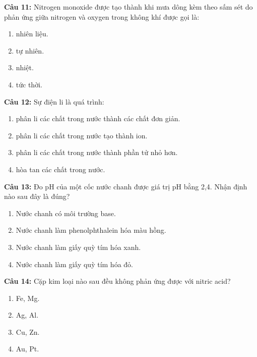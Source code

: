 \documentclass[10.5pt,a4paper]{article}
\begin{document}
\textbf{Câu 11:} Nitrogen monoxide được tạo thành khi mưa dông kèm theo sấm sét do phản ứng giữa nitrogen và oxygen trong không khí được gọi là:
\begin{enumerate}[label=\textbf{\Alph*.}, itemsep=1pt, topsep=1pt, leftmargin=1.5cm]
    \item {} nhiên liệu. \hfill \item {} tự nhiên. \hfill \item {} nhiệt. \hfill \item {} tức thời.
\end{enumerate}

\textbf{Câu 12:} Sự điện li là quá trình:
\begin{enumerate}[label=\textbf{\Alph*.}, itemsep=1pt, topsep=1pt, leftmargin=1.5cm]
    \item phân li các chất trong nước thành các chất đơn giản.
    \item phân li các chất trong nước tạo thành ion.
    \item phân li các chất trong nước thành phần tử nhỏ hơn.
    \item hòa tan các chất trong nước.
\end{enumerate}

\textbf{Câu 13:} Đo pH của một cốc nước chanh được giá trị pH bằng 2,4. Nhận định nào sau đây là đúng?
\begin{enumerate}[label=\textbf{\Alph*.}, itemsep=1pt, topsep=1pt, leftmargin=1.5cm]
    \item Nước chanh có môi trường base. \hfill \item Nước chanh làm phenolphthalein hóa màu hồng.
    \item Nước chanh làm giấy quỳ tím hóa xanh. \hfill \item Nước chanh làm giấy quỳ tím hóa đỏ.
\end{enumerate}

\textbf{Câu 14:} Cặp kim loại nào sau đều không phản ứng được với nitric acid?
\begin{enumerate}[label=\textbf{\Alph*.}, itemsep=1pt, topsep=1pt, leftmargin=1.5cm]
    \item Fe, Mg. \hfill \item Ag, Al. \hfill \item Cu, Zn. \hfill \item Au, Pt.
\end{enumerate}
\end{document}
